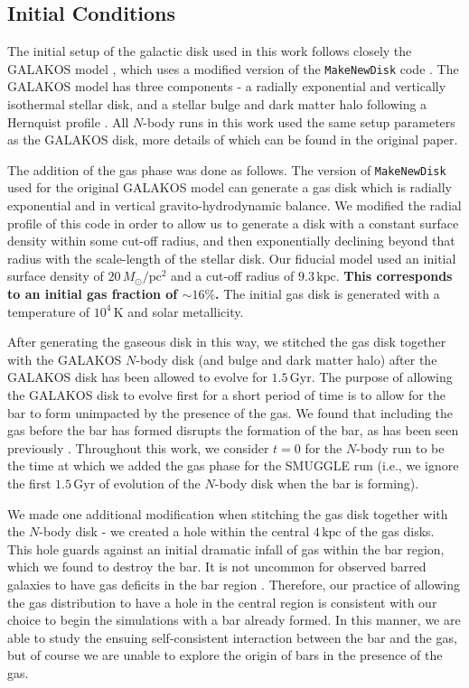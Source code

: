 \documentclass[twocolumn,linenumbers,trackchanges]{aastex631}
\newcommand{\Nbody}{$N$-body}
\newcommand{\SMUGGLE}{SMUGGLE}
\begin{document}
\subsection{Initial Conditions}
The initial setup of the galactic disk used in this work follows closely the
GALAKOS model \citep{2020ApJ...890..117D}, which uses a modified version of the
\texttt{MakeNewDisk} code \citep{2005MNRAS.361..776S}. The GALAKOS model has
three components - a radially exponential and vertically isothermal stellar
disk, and a stellar bulge and dark matter halo following a Hernquist profile
\citep{1990ApJ...356..359H}. All \Nbody{} runs in this work used the same setup
parameters as the GALAKOS disk, more details of which can be found in the
original paper.

The addition of the gas phase was done as follows. The version of
\texttt{MakeNewDisk} used for the original GALAKOS model can generate a gas disk
which is radially exponential and in vertical gravito-hydrodynamic balance. We
modified the radial profile of this code in order to allow us to generate a disk
with a constant surface density within some cut-off radius, and then
exponentially declining beyond that radius with the scale-length of the stellar
disk. Our fiducial model used an initial surface density of
$20\,M_{\odot}/\textrm{pc}^2$ and a cut-off radius of $9.3\,\textrm{kpc}$. {\bf
This corresponds to an initial gas fraction of $\sim16\%$.} The initial gas disk
is generated with a temperature of $10^4\,\textrm{K}$ and solar metallicity.

After generating the gaseous disk in this way, we stitched the gas disk together
with the GALAKOS \Nbody{} disk (and bulge and dark matter halo) after the
GALAKOS disk has been allowed to evolve for $1.5\,\textrm{Gyr}$. The purpose of
allowing the GALAKOS disk to evolve first for a short period of time is to allow
for the bar to form unimpacted by the presence of the gas. We found that
including the gas before the bar has formed disrupts the formation of the bar,
as has been seen previously \citep[e.g.,][]{2013MNRAS.429.1949A}. Throughout
this work, we consider $t=0$ for the \Nbody{} run to be the time at which we
added the gas phase for the \SMUGGLE{} run (i.e., we ignore the first
$1.5\,\textrm{Gyr}$ of evolution of the \Nbody{} disk when the bar is forming).

We made one additional modification when stitching the gas disk together with
the \Nbody{} disk - we created a hole within the central $4\,\textrm{kpc}$ of
the gas disks. This hole guards against an initial dramatic infall of gas within
the bar region, which we found to destroy the bar. It is not uncommon for
observed barred galaxies to have gas deficits in the bar region \citep[though
not in the very center;][]{1993RPPh...56..173S}. Therefore, our practice of
allowing the gas distribution to have a hole in the central region is consistent
with our choice to begin the simulations with a bar already formed. In this
manner, we are able to study the ensuing self-consistent interaction between the
bar and the gas, but of course we are unable to explore the origin of bars in
the presence of the gas.
\end{document}
